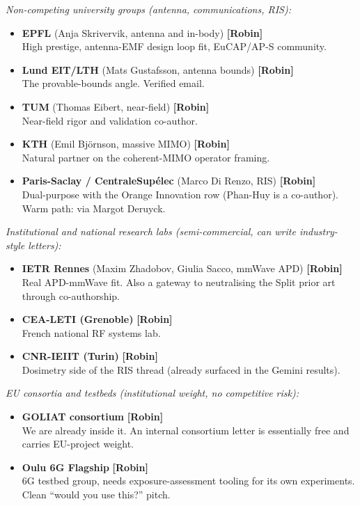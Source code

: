 \documentclass[11pt,a4paper]{article}
\newcommand{\owner}[1]{\textbf{[#1]}}
\begin{document}
\textit{Non-competing university groups (antenna, communications, RIS):}
\begin{itemize}[itemsep=0.5em, leftmargin=1.4em]
  \item \textbf{EPFL} (Anja Skrivervik, antenna and in-body) \quad \owner{Robin}\\
  High prestige, antenna-EMF design loop fit, EuCAP/AP-S community.

  \item \textbf{Lund EIT/LTH} (Mats Gustafsson, antenna bounds) \quad \owner{Robin}\\
  The provable-bounds angle. Verified email.

  \item \textbf{TUM} (Thomas Eibert, near-field) \quad \owner{Robin}\\
  Near-field rigor and validation co-author.

  \item \textbf{KTH} (Emil Bj\"ornson, massive MIMO) \quad \owner{Robin}\\
  Natural partner on the coherent-MIMO operator framing.

  \item \textbf{Paris-Saclay / CentraleSup\'elec} (Marco Di Renzo, RIS) \quad \owner{Robin}\\
  Dual-purpose with the Orange Innovation row (Phan-Huy is a co-author). Warm path: via Margot Deruyck.
\end{itemize}

\textit{Institutional and national research labs (semi-commercial, can write industry-style letters):}
\begin{itemize}[itemsep=0.5em, leftmargin=1.4em]
  \item \textbf{IETR Rennes} (Maxim Zhadobov, Giulia Sacco, mmWave APD) \quad \owner{Robin}\\
  Real APD-mmWave fit. Also a gateway to neutralising the Split prior art through co-authorship.

  \item \textbf{CEA-LETI (Grenoble)} \quad \owner{Robin}\\
  French national RF systems lab.

  \item \textbf{CNR-IEIIT (Turin)} \quad \owner{Robin}\\
  Dosimetry side of the RIS thread (already surfaced in the Gemini results).
\end{itemize}

\textit{EU consortia and testbeds (institutional weight, no competitive risk):}
\begin{itemize}[itemsep=0.5em, leftmargin=1.4em]
  \item \textbf{GOLIAT consortium} \quad \owner{Robin}\\
  We are already inside it. An internal consortium letter is essentially free and carries EU-project weight.

  \item \textbf{Oulu 6G Flagship} \quad \owner{Robin}\\
  6G testbed group, needs exposure-assessment tooling for its own experiments. Clean ``would you use this?'' pitch.
\end{itemize}
\end{document}
